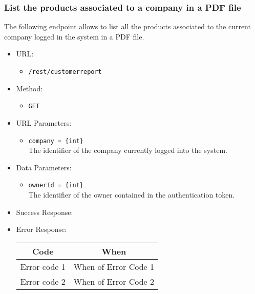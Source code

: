 \subsubsection*{List the products associated to a company in a PDF file}

The following endpoint allows to list all the products associated to the current company logged in the system in a PDF file.

\begin{itemize}
    
    \item URL: 
    \begin{itemize}
        \item \texttt{/rest/customerreport}
    \end{itemize}
    
    \item Method: 
    \begin{itemize}
        \item \texttt{GET}
    \end{itemize}
    
    \item URL Parameters: 
    \begin{itemize}
        \item \texttt{company = \{int\}} \\
        The identifier of the company currently logged into the system.
    \end{itemize}
    
    \item Data Parameters: 
    \begin{itemize}
        \item \texttt{ownerId = \{int\}} \\
        The identifier of the owner contained in the authentication token.
    \end{itemize}
    
    \item Success Response: 
    
    \item Error Response:
    \begin{table}[!h]
    \centering 
    \begin{tabular}{|c|c|}
    \hline
    \multicolumn{1}{|c|}{\textbf{Code}} & \multicolumn{1}{c|}{\textbf{When}} \\ \hline
    Error code 1 & When of Error Code 1 \\\hline
    Error code 2 & When of Error Code 2 \\\hline
    \end{tabular} 
    \end{table} 
    
\end{itemize}




